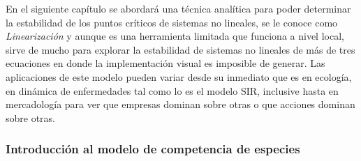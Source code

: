 \newpage
En el siguiente capítulo se abordará una técnica analítica para poder determinar la estabilidad de los puntos críticos de sistemas no lineales, se le conoce como \textit{Linearización} y aunque es una herramienta limitada que funciona a nivel local, sirve de mucho para explorar la estabilidad de sistemas no lineales de más de tres ecuaciones en donde la implementación visual es imposible de generar. Las aplicaciones de este modelo pueden variar desde su inmediato que es en ecología, en dinámica de enfermedades tal como lo es el modelo SIR, inclusive hasta en mercadología para ver que empresas dominan sobre otras o que acciones dominan sobre otras.
\subsubsection{Introducción al modelo de competencia de especies}

